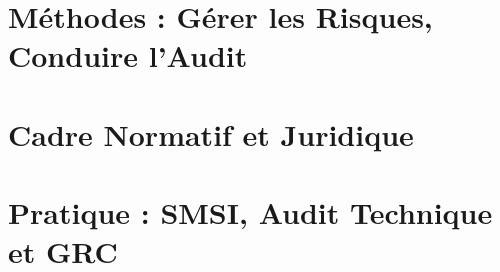 \documentclass[12pt, twoside, openright, a4paper]{book}
\begin{document}
    \part{Méthodes : Gérer les Risques, Conduire l'Audit}
    \label{part:methode}

        
        
        
        
        

    \part{Cadre Normatif et Juridique}
    \label{part:normatif}

        
        
        

    \part{Pratique : SMSI, Audit Technique et GRC}
    \label{part:pratique}

        
        
        
        
\end{document}
